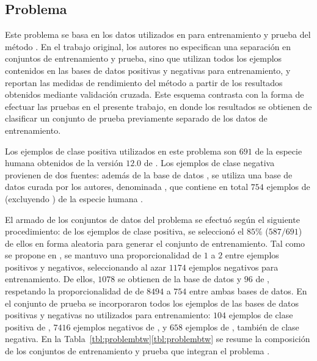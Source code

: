 %
%
\subsection{Problema \micropred{}}
%
Este problema se basa en los datos utilizados en \cite{batuwita} para
entrenamiento y prueba del método \work{\micropred}.
En el trabajo original, los autores no especifican una separación
en conjuntos de entrenamiento y prueba, sino que utilizan todos los
ejemplos contenidos en las bases de datos positivas y negativas para
entrenamiento, y reportan las medidas de rendimiento del método
a partir de los resultados obtenidos mediante validación cruzada.
Este esquema contrasta con la forma de efectuar las pruebas en el
presente trabajo, en donde los resultados se obtienen de clasificar un
conjunto de prueba previamente separado de los datos de entrenamiento.

Los ejemplos de clase positiva utilizados en este problema son $691$
 de la especie humana obtenidos de la versión $12$.$0$ de
\dset{\mirbase}.
Los ejemplos de clase negativa provienen de dos fuentes: además de la
base de datos , se utiliza una base de datos curada por
los autores, denominada , que contiene en
total $754$ ejemplos de  (excluyendo ) de la
especie humana \cite{batuwita}.

El armado de los conjuntos de datos del problema \prob\micropred{} se
efectuó según el siguiente procedimiento:
de los ejemplos de clase positiva, se seleccionó el $85\%$ ($587/691$)
de ellos en forma aleatoria para generar el conjunto de entrenamiento.
Tal como se propone en \cite{ng}, se mantuvo una proporcionalidad de
$1$ a $2$ entre ejemplos positivos y negativos, seleccionando al azar
$1174$ ejemplos negativos para entrenamiento.
De ellos, $1078$ se obtienen de la base de datos  y $96$
de , respetando la proporcionalidad de
de $8494$ a $754$ entre ambas bases de datos.
En el conjunto de prueba se incorporaron todos los ejemplos de las
bases de datos positivas y negativas no utilizados para entrenamiento:
$104$ ejemplos de clase positiva de , $7416$ ejemplos
negativos de , y $658$ ejemplos de , también de clase negativa.
En la \iflatexml{}Tabla~\ref{tbl:problembtw}\else\autoref{tbl:problembtw}\fi{}
se resume la composición de los conjuntos de entrenamiento y prueba
que integran el problema \prob\micropred{}.
